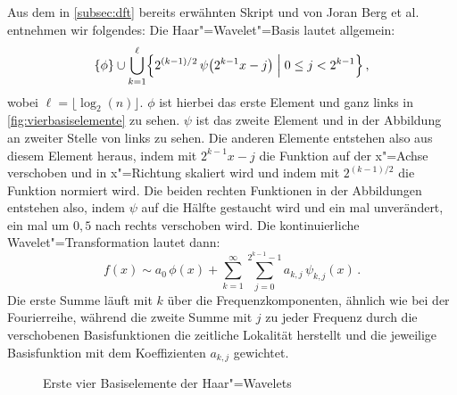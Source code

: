 Aus dem in \autoref{subsec:dft} bereits erwähnten Skript und von Joran Berg et al.\cite{wavelets} entnehmen wir folgendes: Die Haar"=Wavelet"=Basis lautet allgemein: \[ \{\phi\} \cup \bigcup_{k=1}^\ell \Bigl\{ 2^{(k-1)/2} \, \psi \bigl( 2^{k-1} x - j \bigr) \Bigm| 0 \leq j < 2^{k-1} \Bigr\} \,, \]
wobei $\ell=\lfloor \log_2(n) \rfloor$. $\phi$ ist hierbei das erste Element und ganz links in \autoref{fig:vierbasiselemente} zu sehen. $\psi$ ist das zweite Element und in der Abbildung an zweiter Stelle von links zu sehen. Die anderen Elemente entstehen also aus diesem Element heraus, indem mit $2^{k-1}x-j$ die Funktion auf der x"=Achse verschoben und in x"=Richtung skaliert wird und indem mit $2^{(k-1)/2}$ die Funktion normiert wird. Die beiden rechten Funktionen in der Abbildungen entstehen also, indem $\psi$ auf die Hälfte gestaucht wird und ein mal unverändert, ein mal um $0,5$ nach rechts verschoben wird. Die kontinuierliche Wavelet"=Transformation lautet dann: \[f(x) \sim a_0 \, \phi(x) + \sum_{k=1}^\infty \sum_{j=0}^{2^{k-1}-1} a_{k,j} \, \psi_{k,j}(x) \,.\] Die erste Summe läuft mit $k$ über die Frequenzkomponenten, ähnlich wie bei der Fourierreihe, während die zweite Summe mit $j$ zu jeder Frequenz durch die verschobenen Basisfunktionen die zeitliche Lokalität herstellt und die jeweilige Basisfunktion mit dem Koeffizienten $a_{k,j}$ gewichtet.
\begin{figure}[h]
  \hfill%
  \hfill%
  \hfill%
  \caption{Erste vier Basiselemente der Haar"=Wavelets}
\end{figure}\label{fig:vierbasiselemente}
\renewcommand{\waveletfunction}[1]{%
 \begin{tikzpicture}[x = 20mm, y = 20mm]
  \useasboundingbox (-0.45, -1.5) rectangle (1.2, 1.7);
  \draw [->] (-0.1, 0) -- (1.2, 0);
  \draw [->] (0, -1.5) -- (0, 1.7);
  \tikztextr{1.2}{0.15}{$x$}
  \tikztextl{0.075}{1.65}{$y$}
  \tikztextc{0}{-0.15}{$0$}
  \tikztextc{0.5}{-0.15}{$0{,}5\ell$}
  \tikztextc{1}{-0.15}{$\ell$}
  \tikztextr{-0.075}{-1}{$-c$}
  \tikztextr{-0.075}{1}{$c$}
  \draw [blue, thick] (-0.05, 0) -| #1 -- (1.05, 0);
 \end{tikzpicture}%
}

